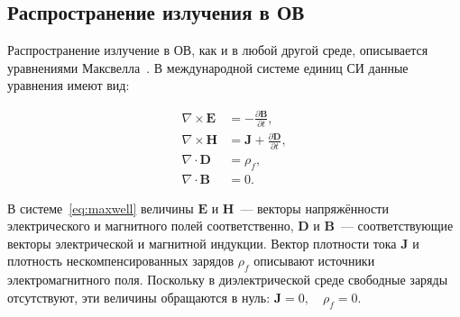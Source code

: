\subsection{Распространение излучения в ОВ}\label{subsec:propagation}
Распространение излучение в ОВ, как и в любой другой среде, описывается уравнениями Максвелла~\cite{kalluri2013principles}. В международной системе единиц СИ данные уравнения имеют вид:


\begin{subequations}\label{eq:maxwell}
	\begin{align}
		\nabla \times \mathbf{E} &= -\frac{\partial \mathbf{B}}{\partial t}, \\
		\nabla \times \mathbf{H} &= \mathbf{J} + \frac{\partial \mathbf{D}}{\partial t}, \\
		\nabla \cdot \mathbf{D} &= \rho_f, \\
		\nabla \cdot \mathbf{B} &= 0.
	\end{align}
\end{subequations}


В системе~\cref{eq:maxwell} величины $\mathbf{E}$ и $\mathbf{H}$~--- векторы напряжённости электрического и магнитного полей соответственно,  $\mathbf{D}$ и $\mathbf{B}$~--- соответствующие векторы электрической и магнитной индукции. Вектор плотности тока $\mathbf{J}$ и плотность нескомпенсированных зарядов $\rho_f$ описывают источники электромагнитного поля. Поскольку в диэлектрической среде свободные заряды отсутствуют, эти величины обращаются в нуль: $\mathbf{J}=0,\quad\rho_f=0$.

